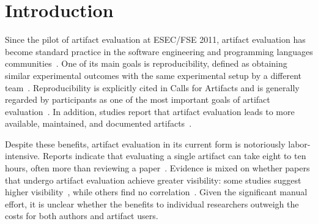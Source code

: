 \section{Introduction}
\label{s:introduction}

Since the pilot of artifact evaluation at ESEC/FSE 2011, artifact evaluation has become standard practice in the software engineering and programming languages communities~\cite{DBLP:journals/cacm/KrishnamurthiV15}.
One of its main goals is reproducibility, defined as obtaining similar experimental outcomes with the same experimental setup by a different team~\cite{acm-artifact-badging-v1_1}.
Reproducibility is explicitly cited in Calls for Artifacts and is generally regarded by participants as one of the most important goals of artifact evaluation~\cite{DBLP:conf/sigsoft/Hermann0S20}.
In addition, studies report that artifact evaluation leads to more available, maintained, and documented artifacts~\cite{DBLP:conf/se/0001T0C0H024}.

Despite these benefits, artifact evaluation in its current form is notoriously labor-intensive.
Reports indicate that evaluating a single artifact can take eight to ten hours, often more than reviewing a paper~\cite{DBLP:journals/ieeesp/Hermann22}.
Evidence is mixed on whether papers that undergo artifact evaluation achieve greater visibility: some studies suggest higher visibility~\cite{DBLP:journals/ese/HeumullerNKO20}, while others find no correlation~\cite{DBLP:conf/se/0001T0C0H024}.
Given the significant manual effort, it is unclear whether the benefits to individual researchers outweigh the costs for both authors and artifact users.

